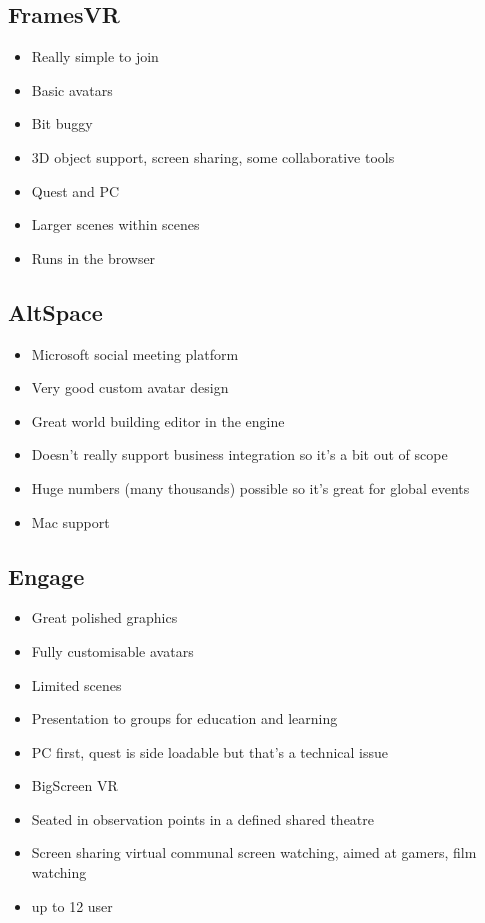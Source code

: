 \subsection{FramesVR}
\begin{itemize}
\item Really simple to join
\item Basic avatars
\item Bit buggy
\item 3D object support, screen sharing, some collaborative tools
\item Quest and PC
\item Larger scenes within scenes
\item Runs in the browser
\end{itemize}
\subsection{AltSpace}
\begin{itemize}
\item Microsoft social meeting platform
\item Very good custom avatar design
\item Great world building editor in the engine
\item Doesn't really support business integration so it's a bit out of scope
\item Huge numbers (many thousands) possible so it's great for global events
\item Mac support
\end{itemize}
\subsection{Engage}
\begin{itemize}
\item Great polished graphics
\item Fully customisable avatars
\item Limited scenes
\item Presentation to groups for education and learning
\item PC first, quest is side loadable but that's a technical issue
\item BigScreen VR
\item Seated in observation points in a defined shared theatre
\item Screen sharing virtual communal screen watching, aimed at gamers, film watching
\item up to 12 user
\end{itemize}
